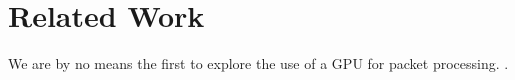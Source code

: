\section{Related Work}

We are by no means the first to explore the use of a GPU for packet processing.
.
